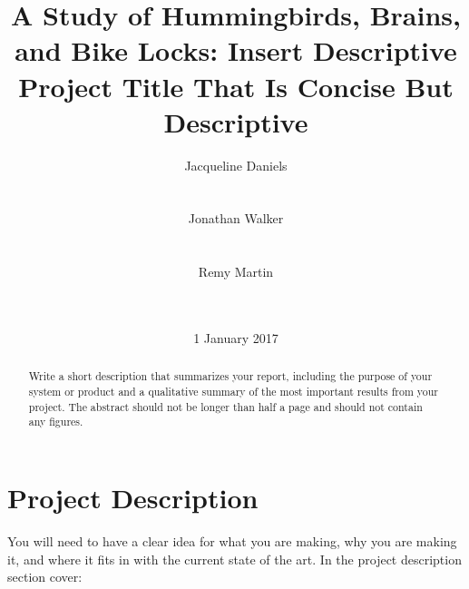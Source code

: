 \documentclass{sig-alternate-ipsn13}
\begin{document}
\title{A Study of Hummingbirds, Brains, and Bike Locks: Insert Descriptive Project Title That Is Concise But Descriptive}


\author{
  \alignauthor
  Jacqueline Daniels\\
         \\
          \\
  \alignauthor
  Jonathan Walker\\
         \\
          \\
  \alignauthor
  Remy Martin\\
         \\
          \\
}

\date{1 January 2017}

\maketitle


\begin{abstract}
Write a short description that summarizes your report, including the purpose of your system or product and a qualitative summary of the most important results from your project. The abstract should not be longer than half a page and should not contain any figures.
\end{abstract}


\section{Project Description} 

You will need to have a clear idea for what you are making, why you are making it, and where it fits in with the current state of the art. In the project description section cover:
\end{document}
